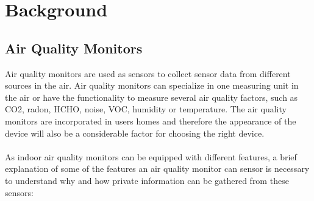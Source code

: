 \chapter*{Background}

\section*{Air Quality Monitors}
Air quality monitors are used as sensors to collect sensor data from different sources in the air. \cite{GeneralAirQualityMonitor} Air quality monitors can specialize in one measuring unit in the air or have the functionality to measure several air quality factors, such as CO2, radon, HCHO, noise, VOC, humidity or temperature. The air quality monitors are incorporated in users homes and therefore the appearance of the device will also be a considerable factor for choosing the right device. \cite{IAQMonitorCommunicationReview} 
\\\\
As indoor air quality monitors can be equipped with different features, a brief explanation of some of the features an air quality monitor can sensor is necessary to understand why and how private information can be gathered from these sensors:
